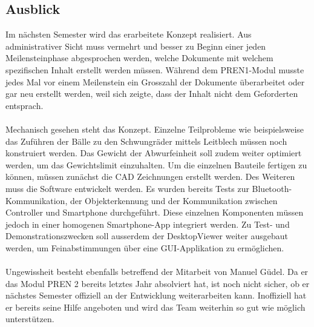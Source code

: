 \subsection{Ausblick}
Im nächsten Semester wird das erarbeitete Konzept realisiert. Aus administrativer 
Sicht muss vermehrt und besser zu Beginn einer jeden Meilensteinphase abgesprochen 
werden, welche Dokumente mit welchem spezifischen Inhalt erstellt werden müssen. 
Während dem PREN1-Modul musste jedes Mal vor einem Meilenstein ein Grosszahl der 
Dokumente überarbeitet oder gar neu erstellt werden, weil sich zeigte, dass der 
Inhalt nicht dem Geforderten entsprach.\\
\\
Mechanisch gesehen steht das Konzept. Einzelne Teilprobleme wie beispielsweise 
das Zuführen der Bälle zu den Schwungräder mittels Leitblech müssen noch konstruiert 
werden. Das Gewicht der Abwurfeinheit soll zudem weiter optimiert werden, um das 
Gewichtslimit einzuhalten. Um die einzelnen Bauteile fertigen zu können, müssen 
zunächst die CAD Zeichnungen erstellt werden. Des Weiteren muss die Software 
entwickelt werden. Es wurden bereits Tests zur Bluetooth-Kommunikation, der 
Objekterkennung und der Kommunikation zwischen Controller und Smartphone 
durchgeführt. Diese einzelnen Komponenten müssen jedoch in einer homogenen 
Smartphone-App integriert werden. Zu Test- und Demonstrationszwecken soll ausserdem 
der DesktopViewer weiter ausgebaut werden, um Feinabstimmungen über eine 
GUI-Applikation zu ermöglichen.\\
\\
Ungewissheit besteht ebenfalls betreffend der Mitarbeit von Manuel Güdel. Da er 
das Modul PREN 2 bereits letztes Jahr absolviert hat, ist noch nicht sicher, ob 
er nächstes Semester offiziell an der Entwicklung weiterarbeiten kann. Inoffiziell 
hat er bereits seine Hilfe angeboten und wird das Team weiterhin so gut wie möglich 
unterstützen.
